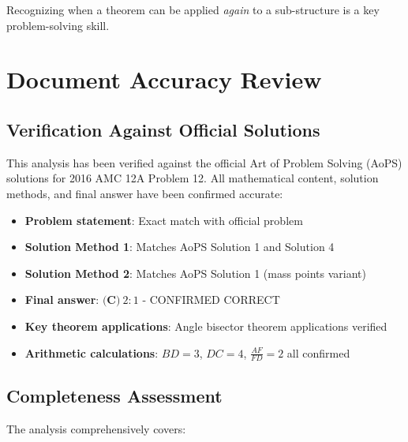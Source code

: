 \documentclass[12pt]{article}
\begin{document}
Recognizing when a theorem can be applied \emph{again} to a sub-structure is a key problem-solving skill.

\section*{Document Accuracy Review}

\subsection*{Verification Against Official Solutions}
This analysis has been verified against the official Art of Problem Solving (AoPS) solutions for 2016 AMC 12A Problem 12. All mathematical content, solution methods, and final answer have been confirmed accurate:

\begin{itemize}[leftmargin=*]
    \item \textbf{Problem statement}: Exact match with official problem
    \item \textbf{Solution Method 1}: Matches AoPS Solution 1 and Solution 4
    \item \textbf{Solution Method 2}: Matches AoPS Solution 1 (mass points variant)
    \item \textbf{Final answer}: $\boxed{\textbf{(C)}\ 2:1}$ - CONFIRMED CORRECT
    \item \textbf{Key theorem applications}: Angle bisector theorem applications verified
    \item \textbf{Arithmetic calculations}: $BD = 3$, $DC = 4$, $\frac{AF}{FD} = 2$ all confirmed
\end{itemize}

\subsection*{Completeness Assessment}

The analysis comprehensively covers:
\end{document}
